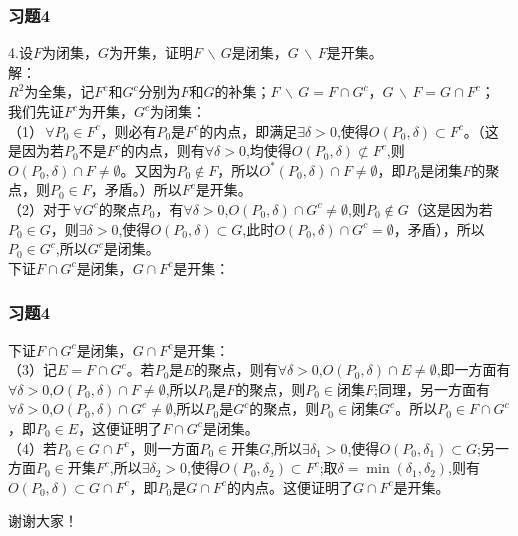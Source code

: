 \documentclass[xetex]{beamer}
\begin{document}
\begin{frame}
    \frametitle{习题4} 
   4.设$F$为闭集，$G$为开集，证明$F \,\backslash\, G$是闭集，$G \,\backslash\, F$是开集。
	\\解：\\$R^2$为全集，记$F^c$和$G^c$分别为$F$和$G$的补集；$F \,\backslash\, G=F\cap G^c$，$G \, \backslash\, F=G\cap F^c$；
	我们先证$F^c$为开集，$G^c$为闭集：\\
	（1）$\, \forall P_{0} \in F^c$，则必有$P_{0}$是$F^c$的内点，即满足$\exists \delta >0$,使得$O(P_{0},\delta) \subset F^c$。（这是因为若$P_{0}$不是$F^c$的内点，则有$\forall \delta >0$,均使得$O(P_{0},\delta ) \not\subset F^c$,则$O(P_{0},\delta) \cap F \ne \emptyset$。又因为$P_{0}\not\in F$，所以$O^*(P_{0},\delta) \cap F \ne \emptyset$，即$P_{0}$是闭集$F$的聚点，则$P_{0}\in F$，矛盾。）所以$F^c$是开集。\\
	（2）对于$\, \forall G^c$的聚点$P_{0}$，有$\forall \delta >0$,$O(P_{0},\delta) \cap G^c \ne \emptyset$,则$P_{0}\not\in G$（这是因为若$P_{0}\in G$，则$\exists \delta >0$,使得$O(P_{0},\delta) \subset G$,此时$O(P_{0},\delta) \cap G^c = \emptyset$，矛盾），所以$P_{0}\in G^c$,所以$G^c$是闭集。
\\下证$F\cap G^c$是闭集，$G\cap F^c$是开集：
	
\end{frame}
\begin{frame}
    \frametitle{习题4} 
下证$F\cap G^c$是闭集，$G\cap F^c$是开集：\\
（3）记$E=F\cap G^c$。若$P_{0}$是$E$的聚点，则有$\forall \delta >0$,$O(P_{0},\delta) \cap E \ne \emptyset$,即一方面有$\forall \delta >0$,$O(P_{0},\delta) \cap F \ne \emptyset$,所以$P_{0}$是$F$的聚点，则$P_{0}\in$闭集$F$;同理，另一方面有$\forall \delta >0$,$O(P_{0},\delta) \cap G^c \ne \emptyset$,所以$P_{0}$是$G^c$的聚点，则$P_{0}\in$闭集$G^c$。所以$P_{0}\in F\cap G^c$，即$P_{0}\in E$，这便证明了$F\cap G^c$是闭集。\\
（4）若$P_{0}\in G\cap F^c$，则一方面$P_{0}\in$开集$G$,所以$\exists\delta_1>0$,使得$O(P_{0},\delta_1) \subset G$;另一方面$P_{0}\in$开集$F^c$,所以$\exists\delta_2>0$,使得$O(P_{0},\delta_2) \subset F^c$;取$\delta=\min(\delta_1,\delta_2)$,则有$O(P_{0},\delta) \subset G\cap F^c$，即$P_{0}$是$G\cap F^c$的内点。这便证明了$G\cap F^c$是开集。
\end{frame}
 

\begin{frame}[standout]
谢谢大家！
\end{frame}

 
\end{document}
